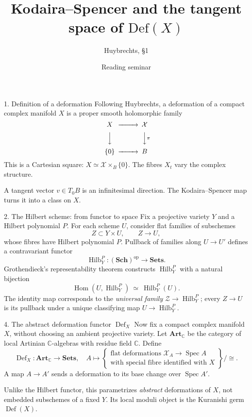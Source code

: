 \documentclass[aspectratio=169]{beamer}
\title{Kodaira--Spencer and the tangent space of $\mathrm{Def}(X)$}
\subtitle{Huybrechts, \S1}
\date{Reading seminar}
\begin{document}
\begin{frame}\titlepage\end{frame}
\begin{frame}{1. Definition of a deformation}
Following Huybrechts, a deformation of a compact complex
manifold $X$ is a proper smooth holomorphic family
\[
\begin{CD}
X @>>> \mathcal X\\
@VVV @VV{\pi}V\\
\{0\} @>>> B
\end{CD}
\]
This is a Cartesian square: $X\simeq\mathcal X\times_B\{0\}$.
The fibres $X_t$ vary the complex structure.

A tangent vector $v\in T_0B$ is an infinitesimal direction.
The Kodaira--Spencer map turns it into a class on $X$.
\end{frame}

\begin{frame}{2. The Hilbert scheme: from functor to space}
\small
Fix a projective variety $Y$ and a Hilbert polynomial $P$.
For each scheme $U$, consider flat families of subschemes
\[
Z\subset Y\times U,\qquad Z\longrightarrow U,
\]
whose fibres have Hilbert polynomial $P$. Pullback of families
along $U\to U'$ defines a contravariant functor
\[
\operatorname{Hilb}_Y^P:(\mathbf{Sch})^{\mathrm{op}}\to\mathbf{Sets}.
\]
Grothendieck's representability theorem constructs
$\operatorname{Hilb}_Y^P$ with a natural bijection
\[
\operatorname{Hom}(U,\operatorname{Hilb}_Y^P)
\ \simeq\ \operatorname{Hilb}_Y^P(U).
\]
The identity map corresponds to the \emph{universal family}
$\mathcal Z\to\operatorname{Hilb}_Y^P$; every $Z\to U$ is
its pullback under a unique classifying map
$U\to\operatorname{Hilb}_Y^P$.
\end{frame}

\begin{frame}{4. The abstract deformation functor $\operatorname{Def}_X$}
\small
Now fix a compact complex manifold $X$, without
choosing an ambient projective variety.
Let $\mathbf{Art}_{\mathbb C}$ be the category of local
Artinian $\mathbb C$-algebras with residue field $\mathbb C$.
Define
\[
\operatorname{Def}_X:\mathbf{Art}_{\mathbb C}\to\mathbf{Sets},
\quad
A\longmapsto
\left\{
\begin{array}{c}
\text{flat deformations }\mathcal X_A\to\operatorname{Spec}A\\
\text{with special fibre identified with }X
\end{array}\right\}\big/\cong.
\]
A map $A\to A'$ sends a deformation to its base change
over $\operatorname{Spec}A'$.

\medskip
Unlike the Hilbert functor, this parametrizes
\emph{abstract} deformations of $X$, not embedded
subschemes of a fixed $Y$. Its local moduli object is
the Kuranishi germ $\operatorname{Def}(X)$.
\end{frame}
\end{document}
